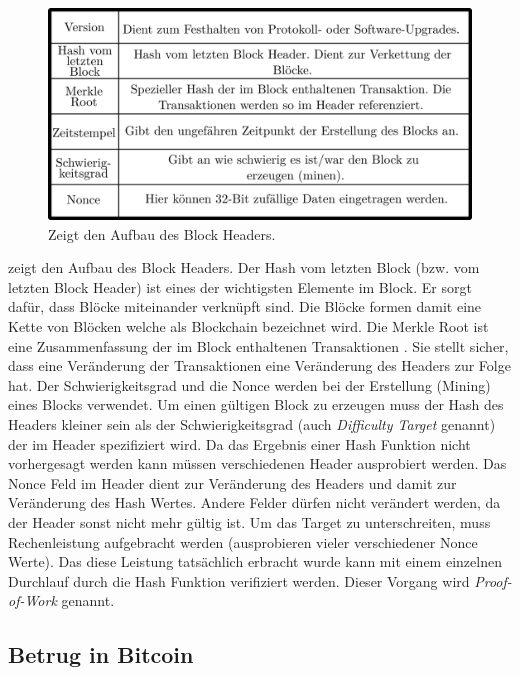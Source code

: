 \documentclass[ngerman,runningheads,a4paper]{llncs}[2018/03/10]
\begin{document}
\begin{figure}
  \centering
  \includegraphics[width=.8\textwidth]{grafiken/tableBlock.png}
  \caption{Zeigt den Aufbau des Block Headers.}
  \label{fig:blockTable}
\end{figure}

 zeigt den Aufbau des Block Headers. Der Hash vom letzten Block (bzw. vom letzten Block Header) ist eines der wichtigsten Elemente im Block. Er sorgt dafür, dass Blöcke miteinander verknüpft sind. Die Blöcke formen damit eine Kette von Blöcken welche als Blockchain bezeichnet wird. Die Merkle Root ist eine Zusammenfassung der im Block enthaltenen Transaktionen \citep{bitcoinbook}. Sie stellt sicher, dass eine Veränderung der Transaktionen eine Veränderung des Headers zur Folge hat. Der Schwierigkeitsgrad und die Nonce werden bei der Erstellung (Mining) eines Blocks verwendet. Um einen gültigen Block zu erzeugen muss der Hash des Headers kleiner sein als der Schwierigkeitsgrad (auch \textit{Difficulty Target} genannt) der im Header spezifiziert wird. Da das Ergebnis einer Hash Funktion nicht vorhergesagt werden kann müssen verschiedenen Header ausprobiert werden. Das Nonce Feld im Header dient zur Veränderung des Headers und damit zur Veränderung des Hash Wertes. Andere Felder dürfen nicht verändert werden, da der Header sonst nicht mehr gültig ist. Um das Target zu unterschreiten, muss Rechenleistung aufgebracht werden (ausprobieren vieler verschiedener Nonce Werte). Das diese Leistung tatsächlich erbracht wurde kann mit einem einzelnen Durchlauf durch die Hash Funktion verifiziert werden. Dieser Vorgang wird \textit{Proof-of-Work} genannt.

\subsection{Betrug in Bitcoin}\label{sec:betrug}
\end{document}

